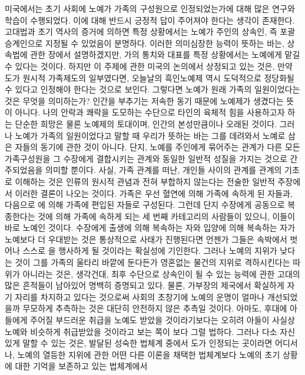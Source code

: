 미국에서는
초기 사회에 노예가 가족의 구성원으로 인정되었는가에 대해
많은 연구와 학습이
수행되었다.
이에 대해 반드시 긍정적 답이 주어져야 한다는 생각이 존재한다.
고대법과 초기 역사의 증거에 의하면
특정 상황에서는 노예가 주인의 상속인, 즉 포괄승계인으로 지정될 수 있었음이
분명하다.
이러한 의미심장한 능력이 뜻하는 바는,
상속법에 관한 장에서 설명하겠지만,
가의 통치와 대표를 특정 상황에서는 노예에게 맡길 수 있다는 것이다.
하지만 이 주제에 관한 미국의 논의에서 상정되고 있는 것은,
만약 도가 원시적 가족제도의 일부였다면,
오늘날의 흑인노예제 역시 도덕적으로 정당화될 수 있다고 인정해야
한다는 것으로 보인다.
그렇다면 노예가 원래 가족의 일원이었다는 것은 무엇을 의미하는가?
인간을 부추기는 저속한 동기 때문에 노예제가 생겼다는 뜻이 아니다.
나의 안락과 쾌락을 도모하는 수단으로 타인의 육체적 힘을 사용하고자 하는
단순한 희망은 물론 노예제의 토대이며,
인간의 본성만큼이나 오래된 것이다.
그러나 노예가 가족의 일원이었다고 말할 때 우리가 뜻하는 바는
그를 데려와서 노예로 삼은 자들의 동기에 관한 것이 아니다.
단지,
노예를 주인에게 묶어주는 관계가
다른 모든 가족구성원을 그 수장에게 결합시키는
관계와 동일한 일반적 성질을 가지는 것으로 간주되었음을 의미할 뿐이다.
사실,
가족 관계를 떠난, 개인들 사이의 관계를
관계의 기초로 이해하는 것은
인류의 원시적 관념과
전혀 부합하지 않는다는
전술한 일반적 주장에서 이러한 결론이 나오는 것이다.
가족은 우선 혈연에 의해 가족에 속하게 된 자들과,
다음으로 에 의해 가족에 편입된 자들로 구성된다.
그런데
단지 수장에게 공동으로 복종한다는 것에 의해 가족에 속하게 되는
세 번째 카테고리의 사람들이 있으니,
이들이 바로 노예인 것이다.
수장에게 출생에 의해 복속하는 자와 입양에 의해 복속하는 자가
노예보다 더 우대받는 것은 통상적으로 사태가 진행된다면
언젠가 그들은 속박에서 벗어나 스스로 을 행사하게 될 것이라는
확실성에 기인한다.
그러나 노예의 지위가 낮다는 것이
그를 가족의 울타리 바깥에 둔다든가
영혼없는 물건의 지위로 격하시킨다는 따위가 아니라는 것은,
생각건대,
최후 수단으로 상속인이 될 수 있는 능력에 관한
고대의 많은 흔적들이 남아있어
명백히 증명되고 있다.
물론,
가부장의 제국에서 확실하게 자기 자리를 차지하고 있다는 것으로써
사회의 초창기에 노예의 운명이 얼마나 개선되었을까 무모하게 추측하는 것은
대단히 안전하지 않은 추측일 것이다.
아마도,
후대에 아들에게 주어질 부드러운 취급을 노예도 받았을 것이라기보다는
오히려 아들이 사실상 노예와 비슷하게 취급받았을 것이라고 보는 쪽이
보다 그럴 법하다.
그러나
다소 자신있게 말할 수 있는 것은,
발달된 성숙한 법체계 중에서
도가 인정되는 곳이라면 어디서나,
노예의 열등한 지위에 관한 어떤 다른 이론을 채택한 법체계보다
노예의 초기 상황에 대한 기억을 보존하고 있는 법체계에서
